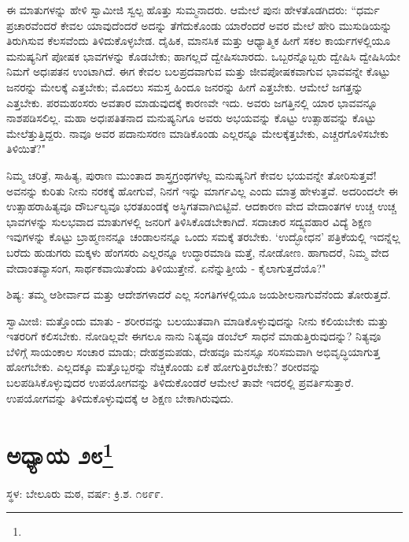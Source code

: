 ಈ ಮಾತುಗಳನ್ನು ಹೇಳಿ ಸ್ವಾಮೀಜಿ ಸ್ವಲ್ಪ ಹೊತ್ತು ಸುಮ್ಮನಾದರು. ಆಮೇಲೆ ಪುನಃ ಹೇಳತೊಡಗಿದರು: “ಧರ್ಮ ಪ್ರಚಾರವೆಂದರೆ ಕೇವಲ ಯಾವುದೆಂದರೆ ಅದನ್ನು ತೆಗೆದುಕೊಂಡು ಯಾರೆಂದರೆ ಅವರ ಮೇಲೆ ಹೇರಿ ಮುಸುಡಿಯನ್ನು ತಿರುಗಿಸುವ ಕೆಲಸವೆಂದು ತಿಳಿದುಕೊಳ್ಳಬೇಡ. ದೈಹಿಕ, ಮಾನಸಿಕ ಮತ್ತು ಆಧ್ಯಾತ್ಮಿಕ ಹೀಗೆ ಸಕಲ ಕಾರ್ಯಗಳಲ್ಲಿಯೂ ಮನುಷ್ಯನಿಗೆ ಪೋಷಕ ಭಾವಗಳನ್ನು ಕೊಡಬೇಕು; ಹಾಗಲ್ಲದೆ ದ್ವೇಷಿಸಬಾರದು. ಒಬ್ಬರನ್ನೊಬ್ಬರು ದ್ವೇಷಿಸಿ ದ್ವೇಷಿಸಿಯೇ ನಿಮಗೆ ಅಧಃಪತನ ಉಂಟಾಗಿದೆ. ಈಗ ಕೇವಲ ಬಲಪ್ರದವಾಗುವ ಮತ್ತು ಜೀವಪೋಷಕವಾಗುವ ಭಾವವನ್ನೇ ಕೊಟ್ಟು ಜನರನ್ನು ಮೇಲಕ್ಕೆ ಎತ್ತಬೇಕು; ಮೊದಲು ಸಮಸ್ತ ಹಿಂದೂ ಜನರನ್ನು ಹೀಗೆ ಎತ್ತಬೇಕು. ಆಮೇಲೆ ಜಗತ್ತನ್ನು ಎತ್ತಬೇಕು. ಪರಮಹಂಸರು ಅವತಾರ ಮಾಡುವುದಕ್ಕೆ ಕಾರಣವೇ ಇದು. ಅವರು ಜಗತ್ತಿನಲ್ಲಿ ಯಾರ ಭಾವವನ್ನೂ ನಾಶಪಡಿಸಲಿಲ್ಲ. ಮಹಾ ಅಧಃಪತಿತನಾದ ಮನುಷ್ಯನಿಗೂ ಅವರು ಅಭಯವನ್ನು ಕೊಟ್ಟು ಉತ್ಸಾಹವನ್ನು ಕೊಟ್ಟು ಮೇಲೆತ್ತುತ್ತಿದ್ದರು. ನಾವೂ ಅವರ ಪದಾನುಸರಣ ಮಾಡಿಕೊಂಡು ಎಲ್ಲರನ್ನೂ ಮೇಲಕ್ಕೆತ್ತಬೇಕು, ಎಚ್ಚರಗೊಳಿಸಬೇಕು ತಿಳಿಯಿತೆ?"

ನಿಮ್ಮ ಚರಿತ್ರೆ, ಸಾಹಿತ್ಯ, ಪುರಾಣ ಮುಂತಾದ ಶಾಸ್ತ್ರಗ್ರಂಥಗಳೆಲ್ಲ ಮನುಷ್ಯನಿಗೆ ಕೇವಲ ಭಯವನ್ನೇ ತೋರಿಸುತ್ತವೆ! ಅವನನ್ನು ಕುರಿತು ನೀನು ನರಕಕ್ಕೆ ಹೋಗುವೆ, ನಿನಗೆ ಇನ್ನು ಮಾರ್ಗವಿಲ್ಲ ಎಂದು ಮಾತ್ರ ಹೇಳುತ್ತವೆ. ಅದರಿಂದಲೇ ಈ ಉತ್ಸಾಹರಾಹಿತ್ಯವೂ ದೌರ್ಬಲ್ಯವೂ ಭರತಖಂಡಕ್ಕೆ ಅಸ್ಥಿಗತವಾಗಿಬಿಟ್ಟಿವೆ. ಆದಕಾರಣ ವೇದ ವೇದಾಂತಗಳ ಉಚ್ಚ ಉಚ್ಚ ಭಾವಗಳನ್ನು ಸುಲಭವಾದ ಮಾತುಗಳಲ್ಲಿ ಜನರಿಗೆ ತಿಳಿಸಿಕೊಡಬೇಕಾಗಿದೆ. ಸದಾಚಾರ ಸದ್ವ್ಯವಹಾರ ವಿದ್ಯೆ ಶಿಕ್ಷಣ ಇವುಗಳನ್ನು ಕೊಟ್ಟು ಬ್ರಾಹ್ಮಣನನ್ನೂ ಚಂಡಾಲನನ್ನೂ ಒಂದು ಸಮಕ್ಕೆ ತರಬೇಕು. ‘ಉದ್ಭೋಧನ’ ಪತ್ರಿಕೆಯಲ್ಲಿ ಇದನ್ನೆಲ್ಲ ಬರೆದು ಹುಡುಗರು ಮಕ್ಕಳು ಹೆಂಗಸರು ಎಲ್ಲರನ್ನೂ ಉದ್ಧಾರಮಾಡಿ ಮತ್ತೆ, ನೋಡೋಣ. ಹಾಗಾದರೆ, ನಿಮ್ಮ ವೇದ ವೇದಾಂತವ್ಯಾಸಂಗ, ಸಾರ್ಥಕವಾಯಿತೆಂದು ತಿಳಿಯುತ್ತೇನೆ. ಏನೆನ್ನುತ್ತೀಯೆ - ಕೈಲಾಗುತ್ತದೆಯೊ?"

ಶಿಷ್ಯ: ತಮ್ಮ ಆಶೀರ್ವಾದ ಮತ್ತು ಆದೇಶಗಳಾದರೆ ಎಲ್ಲ ಸಂಗತಿಗಳಲ್ಲಿಯೂ ಜಯಶೀಲನಾಗುವೆನೆಂದು ತೋರುತ್ತದೆ.

ಸ್ವಾಮೀಜಿ: ಮತ್ತೊಂದು ಮಾತು - ಶರೀರವನ್ನು ಬಲಯುತವಾಗಿ ಮಾಡಿಕೊಳ್ಳುವುದನ್ನು ನೀನು ಕಲಿಯಬೇಕು ಮತ್ತು ಇತರರಿಗೆ ಕಲಿಸಬೇಕು. ನೋಡಿಲ್ಲವೇ ಈಗಲೂ ನಾನು ನಿತ್ಯವೂ ಡಂಬೆಲ್ ಸಾಧನೆ ಮಾಡುತ್ತಿರುವುದನ್ನು? ನಿತ್ಯವೂ ಬೆಳಿಗ್ಗೆ ಸಾಯಂಕಾಲ ಸಂಚಾರ ಮಾಡು; ದೇಹಶ್ರಮಪಡು, ದೇಹವೂ ಮನಸ್ಸೂ ಸರಿಸಮವಾಗಿ ಅಭಿವೃದ್ಧಿಯಾಗುತ್ತ ಹೋಗಬೇಕು. ಎಲ್ಲದಕ್ಕೂ ಮತ್ತೊಬ್ಬರನ್ನು ನೆಚ್ಚಿಕೊಂಡು ಏಕೆ ಹೋಗುತ್ತಿರಬೇಕು? ಶರೀರವನ್ನು ಬಲಪಡಿಸಿಕೊಳ್ಳುವುದರ ಉಪಯೋಗವನ್ನು ತಿಳಿದುಕೊಂಡರೆ ಆಮೇಲೆ ತಾವೇ ಇದರಲ್ಲಿ ಪ್ರವರ್ತಿಸುತ್ತಾರೆ. ಉಪಯೋಗವನ್ನು ತಿಳಿದುಕೊಳ್ಳುವುದಕ್ಕೆ ಆ ಶಿಕ್ಷಣ ಬೇಕಾಗಿರುವುದು.

\newpage

\chapter[ಅಧ್ಯಾಯ ೨೮]{ಅಧ್ಯಾಯ ೨೮\protect\footnote{}}

\begin{center}
ಸ್ಥಳ: ಬೇಲೂರು ಮಠ, ವರ್ಷ: ಕ್ರಿ.ಶ. ೧೮೯೯.
\end{center}

